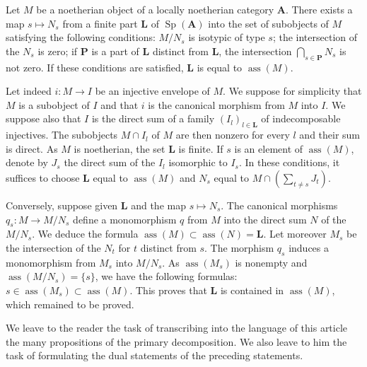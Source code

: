 \begin{proposition}
Let $M$ be a noetherian object of a locally noetherian category
$\mathbf{A}$. There exists a map $s \mapsto N_s$ from a finite part
$\mathbf{L}$ of $\operatorname{Sp}(\mathbf{A})$ into the set of
subobjects of $M$ satisfying the following conditions: $M/N_s$ is
isotypic of type $s$; the intersection of the $N_s$ is zero; if
$\mathbf{P}$ is a part of $\mathbf{L}$ distinct from $\mathbf{L}$,
the intersection $\bigcap_{s\in\mathbf{P}} N_s$ is not zero. If these
conditions are satisfied, $\mathbf{L}$ is equal to
$\operatorname{ass}(M)$.
\end{proposition}

Let indeed $i\colon M \to I$ be an injective envelope of $M$. We
suppose for simplicity that $M$ is a subobject of $I$ and that $i$ is
the canonical morphism from $M$ into $I$. We suppose also that $I$ is
the direct sum of a family $(I_l)_{l\in\mathbf{L}}$ of indecomposable
injectives. The subobjects $M \cap I_l$ of $M$ are then nonzero for
every $l$ and their sum is direct. As $M$ is noetherian, the set
$\mathbf{L}$ is finite. If $s$ is an element of
$\operatorname{ass}(M)$, denote by $J_s$ the direct sum of the $I_l$
isomorphic to $I_s$. In these conditions, it suffices to choose
$\mathbf{L}$ equal to $\operatorname{ass}(M)$ and $N_s$ equal to
$M \cap \left(\sum_{t \ne s} J_t\right)$.

Conversely, suppose given $\mathbf{L}$ and the map $s \mapsto N_s$.
The canonical morphisms $q_s\colon M \to M/N_s$ define a monomorphism
$q$ from $M$ into the direct sum $N$ of the $M/N_s$. We deduce the
formula
$\operatorname{ass}(M) \subset \operatorname{ass}(N) = \mathbf{L}$.
Let moreover $M_s$ be the intersection of the $N_t$ for $t$ distinct
from $s$. The morphism $q_s$ induces a monomorphism from $M_s$ into
$M/N_s$. As $\operatorname{ass}(M_s)$ is nonempty and
$\operatorname{ass}(M/N_s) = \{s\}$, we have the following formulas:
$s \in \operatorname{ass}(M_s) \subset \operatorname{ass}(M)$. This
proves that $\mathbf{L}$ is contained in $\operatorname{ass}(M)$,
which remained to be proved.

We leave to the reader the task of transcribing into the language of
this article the many propositions of the primary decomposition. We
also leave to him the task of formulating the dual statements of the
preceding statements.
